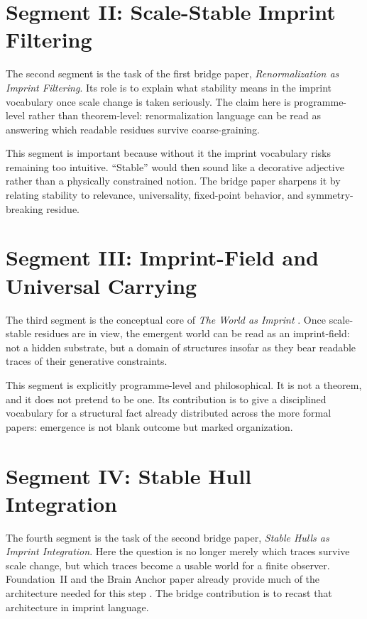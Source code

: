 \documentclass[12pt]{article}
\begin{document}
\section{Segment II: Scale-Stable Imprint Filtering}

The second segment is the task of the first bridge paper, \emph{Renormalization as Imprint Filtering}. Its role is to explain what stability means in the imprint vocabulary once scale change is taken seriously. The claim here is programme-level rather than theorem-level: renormalization language can be read as answering which readable residues survive coarse-graining.

This segment is important because without it the imprint vocabulary risks remaining too intuitive. ``Stable'' would then sound like a decorative adjective rather than a physically constrained notion. The bridge paper sharpens it by relating stability to relevance, universality, fixed-point behavior, and symmetry-breaking residue.

\section{Segment III: Imprint-Field and Universal Carrying}

The third segment is the conceptual core of \emph{The World as Imprint} \cite{WorldImprint}. Once scale-stable residues are in view, the emergent world can be read as an imprint-field: not a hidden substrate, but a domain of structures insofar as they bear readable traces of their generative constraints.

This segment is explicitly programme-level and philosophical. It is not a theorem, and it does not pretend to be one. Its contribution is to give a disciplined vocabulary for a structural fact already distributed across the more formal papers: emergence is not blank outcome but marked organization.

\section{Segment IV: Stable Hull Integration}

The fourth segment is the task of the second bridge paper, \emph{Stable Hulls as Imprint Integration}. Here the question is no longer merely which traces survive scale change, but which traces become a usable world for a finite observer. Foundation~II and the Brain Anchor paper already provide much of the architecture needed for this step \cite{FoundationII,BrainAnchor}. The bridge contribution is to recast that architecture in imprint language.
\end{document}
